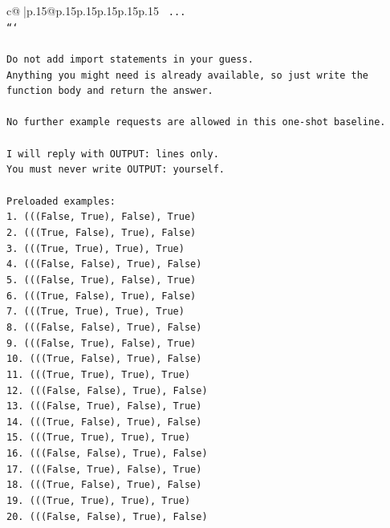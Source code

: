 \documentclass{article}
\begin{document}
{\begin{supertabular}{c@{$\;$}|p{.15\linewidth}@{}p{.15\linewidth}p{.15\linewidth}p{.15\linewidth}p{.15\linewidth}p{.15\linewidth}}
{{{\texttt{    ...} \\
\texttt{```} \\
\\ 
\texttt{Do not add import statements in your guess.} \\
\texttt{Anything you might need is already available, so just write the function body and return the answer.} \\
\\ 
\texttt{No further example requests are allowed in this one{-}shot baseline.} \\
\\ 
\texttt{I will reply with OUTPUT: lines only.} \\
\texttt{You must never write OUTPUT: yourself.} \\
\\ 
\texttt{Preloaded examples:} \\
\texttt{1. (((False, True), False), True)} \\
\texttt{2. (((True, False), True), False)} \\
\texttt{3. (((True, True), True), True)} \\
\texttt{4. (((False, False), True), False)} \\
\texttt{5. (((False, True), False), True)} \\
\texttt{6. (((True, False), True), False)} \\
\texttt{7. (((True, True), True), True)} \\
\texttt{8. (((False, False), True), False)} \\
\texttt{9. (((False, True), False), True)} \\
\texttt{10. (((True, False), True), False)} \\
\texttt{11. (((True, True), True), True)} \\
\texttt{12. (((False, False), True), False)} \\
\texttt{13. (((False, True), False), True)} \\
\texttt{14. (((True, False), True), False)} \\
\texttt{15. (((True, True), True), True)} \\
\texttt{16. (((False, False), True), False)} \\
\texttt{17. (((False, True), False), True)} \\
\texttt{18. (((True, False), True), False)} \\
\texttt{19. (((True, True), True), True)} \\
\texttt{20. (((False, False), True), False)} \\
}}}
\end{supertabular}}
\end{document}
